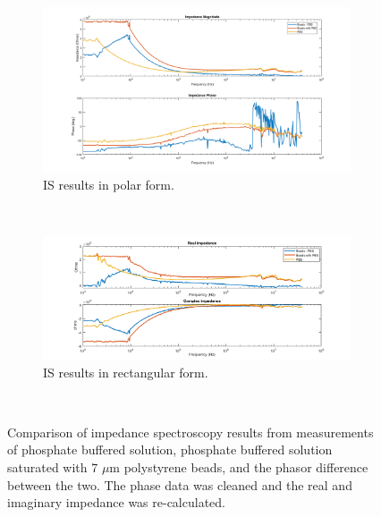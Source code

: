 \begin{figure}[h]
    \centering
    \begin{subfigure}[b]{\textwidth}
        \centering
        \includegraphics[width=\textwidth]{images/IS_data_clean_mag_phase.png}
        \caption{IS results in polar form.}
    \end{subfigure}
    \\
    \vspace{0.1 in}
    \begin{subfigure}[b]{\textwidth}
        \centering
        \includegraphics[width=\textwidth]{images/IS_data_clean_real_imag.png}
        \caption{IS results in rectangular form.}
    \end{subfigure}
    \\
    \vspace{0.1 in}
    \caption[PBS, PBS saturated with micro-beads, and the phasor difference.]{Comparison of impedance spectroscopy results from measurements of phosphate buffered solution, phosphate buffered solution saturated with 7 $\mu$m polystyrene beads, and the phasor difference between the two. The phase data was cleaned and the real and imaginary impedance was re-calculated.}
    \label{fig:IS_data_pbs_pbsBeads_difference}
\end{figure}

